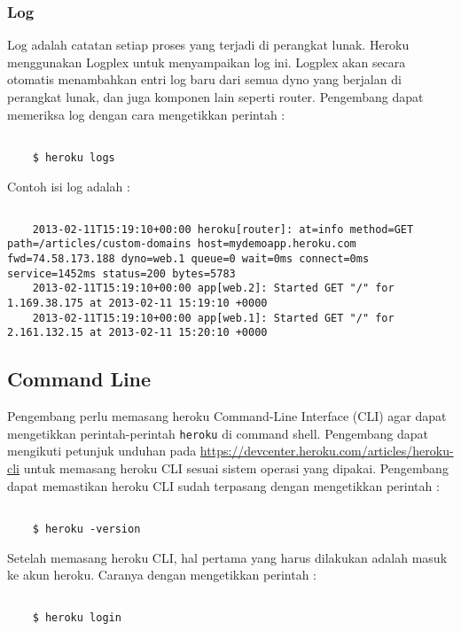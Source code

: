 \subsubsection{Log}
Log adalah catatan setiap proses yang terjadi di perangkat lunak. Heroku menggunakan Logplex untuk menyampaikan log ini. Logplex akan secara otomatis menambahkan entri log baru dari semua dyno yang berjalan di perangkat lunak, dan juga komponen lain seperti router. Pengembang dapat memeriksa log dengan cara mengetikkan perintah :
\begin{lstlisting}

	$ heroku logs

\end{lstlisting}
Contoh isi log adalah :
\begin{lstlisting}

	2013-02-11T15:19:10+00:00 heroku[router]: at=info method=GET path=/articles/custom-domains host=mydemoapp.heroku.com fwd=74.58.173.188 dyno=web.1 queue=0 wait=0ms connect=0ms service=1452ms status=200 bytes=5783
	2013-02-11T15:19:10+00:00 app[web.2]: Started GET "/" for 1.169.38.175 at 2013-02-11 15:19:10 +0000
	2013-02-11T15:19:10+00:00 app[web.1]: Started GET "/" for 2.161.132.15 at 2013-02-11 15:20:10 +0000

\end{lstlisting}

\subsection{Command Line}
Pengembang perlu memasang heroku Command-Line Interface (CLI) agar dapat mengetikkan perintah-perintah \texttt{heroku} di command shell. Pengembang dapat mengikuti petunjuk unduhan pada \url{https://devcenter.heroku.com/articles/heroku-cli} untuk memasang heroku CLI sesuai sistem operasi yang dipakai. Pengembang dapat memastikan heroku CLI sudah terpasang dengan mengetikkan perintah :
\begin{lstlisting}

	$ heroku -version

\end{lstlisting}

Setelah memasang heroku CLI, hal pertama yang harus dilakukan adalah masuk ke akun heroku. Caranya dengan mengetikkan perintah :
\begin{lstlisting}

	$ heroku login

\end{lstlisting}

